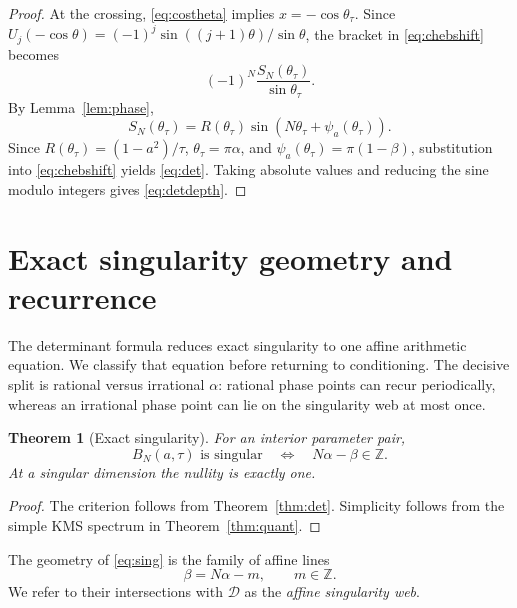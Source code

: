 \documentclass[11pt,reqno]{amsart}
\theoremstyle{plain}
\newtheorem{theorem}{Theorem}
\theoremstyle{definition}
\newcommand{\BN}{B_N}
\newcommand{\Z}{\mathbb{Z}}
\begin{document}
\begin{proof}
At the crossing, \eqref{eq:costheta} implies $x=-\cos\theta_\tau$.  Since
$U_j(-\cos\theta)=(-1)^j\sin((j+1)\theta)/\sin\theta$, the bracket in
\eqref{eq:chebshift} becomes
\[
(-1)^N\frac{S_N(\theta_\tau)}{\sin\theta_\tau}.
\]
By Lemma~\ref{lem:phase},
\[
S_N(\theta_\tau)
=R(\theta_\tau)\sin(N\theta_\tau+\psi_a(\theta_\tau)).
\]
Since $R(\theta_\tau)=(1-a^2)/\tau$,
$\theta_\tau=\pi\alpha$, and
$\psi_a(\theta_\tau)=\pi(1-\beta)$, substitution into
\eqref{eq:chebshift} yields \eqref{eq:det}.  Taking absolute values and reducing the
sine modulo integers gives \eqref{eq:detdepth}.
\end{proof}

\section{Exact singularity geometry and recurrence}\label{sec:singularity}

The determinant formula reduces exact singularity to one affine arithmetic equation.
We classify that equation before returning to conditioning.  The decisive split is
rational versus irrational $\alpha$: rational phase points can recur periodically,
whereas an irrational phase point can lie on the singularity web at most once.

\begin{theorem}[Exact singularity]\label{thm:sing}
For an interior parameter pair,
\begin{equation}\label{eq:sing}
\boxed{
\BN(a,\tau)\text{ is singular}
\quad\Longleftrightarrow\quad
N\alpha-\beta\in\Z.}
\end{equation}
At a singular dimension the nullity is exactly one.
\end{theorem}

\begin{proof}
The criterion follows from Theorem~\ref{thm:det}.  Simplicity follows from the
simple KMS spectrum in Theorem~\ref{thm:quant}.
\end{proof}

The geometry of \eqref{eq:sing} is the family of affine lines
\begin{equation}\label{eq:web}
\beta=N\alpha-m,
\qquad m\in\Z.
\end{equation}
We refer to their intersections with $\mathcal D$ as the \emph{affine singularity
web}.
\end{document}
